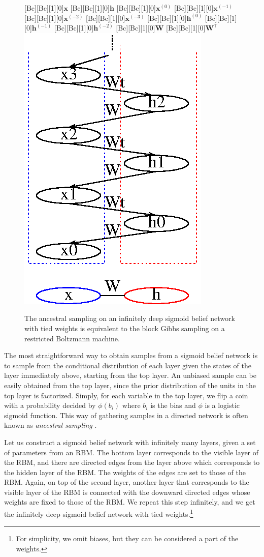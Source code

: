 \documentclass[dissertation,nocontribution]{aaltoseries}
\newcommand{\vect}[1]{\mathbf{#1}}
\newcommand{\matr}[1]{\mathbf{#1}}
\newcommand{\vh}[0]{\vect{h}}
\newcommand{\vx}[0]{\vect{x}}
\newcommand{\mW}[0]{\matr{W}}
\begin{document}
\begin{figure}
    \centering
    [Bc][Bc][1][0]{$\vx$}
    [Bc][Bc][1][0]{$\vh$}
    [Bc][Bc][1][0]{$\vx^{(0)}$}
    [Bc][Bc][1][0]{$\vx^{(-1)}$}
    [Bc][Bc][1][0]{$\vx^{(-2)}$}
    [Bc][Bc][1][0]{$\vx^{(-3)}$}
    [Bc][Bc][1][0]{$\vh^{(0)}$}
    [Bc][Bc][1][0]{$\vh^{(-1)}$}
    [Bc][Bc][1][0]{$\vh^{(-2)}$}
    [Bc][Bc][1][0]{$\mW$}
    [Bc][Bc][1][0]{$\mW^\top$}
    \includegraphics[width=0.4\columnwidth]{figures/rbm_dbn.eps}
    \caption{The ancestral sampling on an infinitely deep
    sigmoid belief network with tied weights is equivalent
    to the block Gibbs sampling on a restricted Boltzmann
    machine.}
    \label{fig:inf_sbn}
\end{figure}

The most straightforward way to obtain samples from a
sigmoid belief network is to sample from the conditional
distribution of each layer given the states of the layer
immediately above, starting from the top layer. An unbiased
sample can be easily obtained from the top layer, since the
prior distribution of the units in the top layer is
factorized. Simply, for each variable in the top layer, we
flip a coin with a probability decided by $\phi(b_i)$
where $b_i$ is the bias and $\phi$ is a logistic sigmoid
function. This way of gathering samples in a directed
network is often known as \textit{ancestral sampling}
\citep[see, e.g.,][]{Bishop2006,Murphy2012}.

Let us construct a sigmoid belief network with infinitely
many layers, given a set of parameters from an RBM. The bottom
layer corresponds to the visible layer of the RBM, and there
are directed edges from the layer above which corresponds to
the hidden layer of the RBM. The weights of the edges are
set to those of the RBM. Again, on top of the second layer,
another layer that corresponds to the visible layer of the
RBM is connected with the downward directed edges whose
weights are fixed to those of the RBM. We repeat this step
infinitely, and we get the infinitely deep sigmoid belief
network with tied weights.\footnote{For simplicity, we
omit biases, but they can be considered a part of the
weights.}
\end{document}

